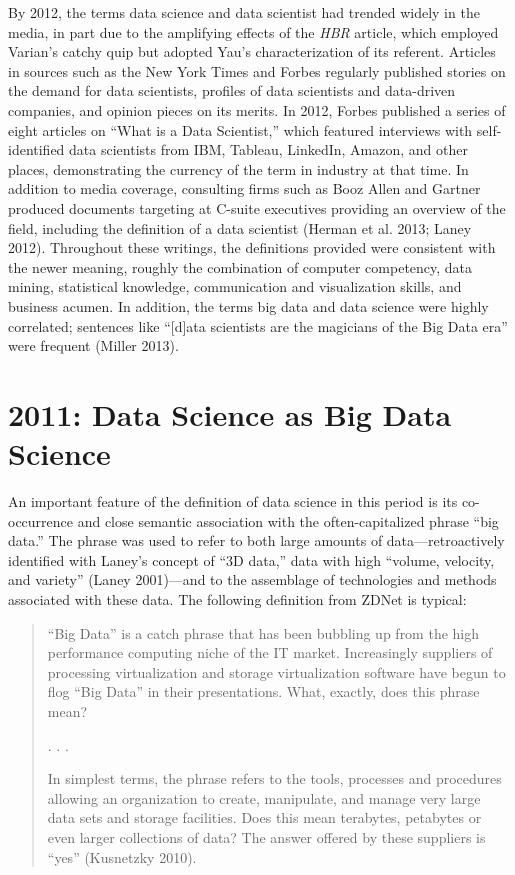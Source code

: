 \documentclass[
  letterpaper,
]{report}
\begin{document}
By 2012, the terms data science and data scientist had trended widely in
the media, in part due to the amplifying effects of the \emph{HBR}
article, which employed Varian's catchy quip but adopted Yau's
characterization of its referent. Articles in sources such as the New
York Times and Forbes regularly published stories on the demand for data
scientists, profiles of data scientists and data-driven companies, and
opinion pieces on its merits. In 2012, Forbes published a series of
eight articles on ``What is a Data Scientist,'' which featured
interviews with self-identified data scientists from IBM, Tableau,
LinkedIn, Amazon, and other places, demonstrating the currency of the
term in industry at that time. In addition to media coverage, consulting
firms such as Booz Allen and Gartner produced documents targeting at
C-suite executives providing an overview of the field, including the
definition of a data scientist (Herman et al. 2013; Laney 2012).
Throughout these writings, the definitions provided were consistent with
the newer meaning, roughly the combination of computer competency, data
mining, statistical knowledge, communication and visualization skills,
and business acumen. In addition, the terms big data and data science
were highly correlated; sentences like ``{[}d{]}ata scientists are the
magicians of the Big Data era'' were frequent (Miller 2013).

\hypertarget{data-science-as-big-data-science}{%
\section{2011: Data Science as Big Data
Science}\label{data-science-as-big-data-science}}

An important feature of the definition of data science in this period is
its co-occurrence and close semantic association with the
often-capitalized phrase ``big data.'' The phrase was used to refer to
both large amounts of data---retroactively identified with Laney's
concept of ``3D data,'' data with high ``volume, velocity, and variety''
(Laney 2001)---and to the assemblage of technologies and methods
associated with these data. The following definition from ZDNet is
typical:

\begin{quote}
``Big Data'' is a catch phrase that has been bubbling up from the high
performance computing niche of the IT market. Increasingly suppliers of
processing virtualization and storage virtualization software have begun
to flog ``Big Data'' in their presentations. What, exactly, does this
phrase mean?

. . .

In simplest terms, the phrase refers to the tools, processes and
procedures allowing an organization to create, manipulate, and manage
very large data sets and storage facilities. Does this mean terabytes,
petabytes or even larger collections of data? The answer offered by
these suppliers is ``yes'' (Kusnetzky 2010).
\end{quote}
\end{document}
